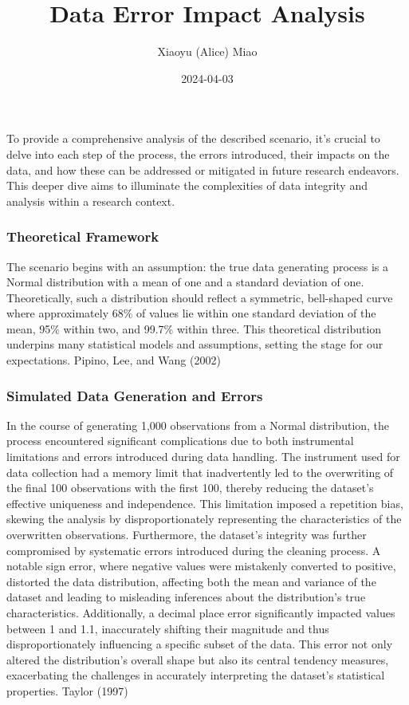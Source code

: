 \documentclass[
  letterpaper,
  DIV=11,
  numbers=noendperiod]{scrartcl}
\title{Data Error Impact Analysis}
\author{Xiaoyu (Alice) Miao}
\date{2024-04-03}
\begin{document}
\maketitle

To provide a comprehensive analysis of the described scenario, it's
crucial to delve into each step of the process, the errors introduced,
their impacts on the data, and how these can be addressed or mitigated
in future research endeavors. This deeper dive aims to illuminate the
complexities of data integrity and analysis within a research context.

\subsubsection{\texorpdfstring{\textbf{Theoretical
Framework}}{Theoretical Framework}}\label{theoretical-framework}

The scenario begins with an assumption: the true data generating process
is a Normal distribution with a mean of one and a standard deviation of
one. Theoretically, such a distribution should reflect a symmetric,
bell-shaped curve where approximately 68\% of values lie within one
standard deviation of the mean, 95\% within two, and 99.7\% within
three. This theoretical distribution underpins many statistical models
and assumptions, setting the stage for our expectations. Pipino, Lee,
and Wang (2002)

\subsubsection{Simulated Data Generation and
Errors}\label{simulated-data-generation-and-errors}

In the course of generating 1,000 observations from a Normal
distribution, the process encountered significant complications due to
both instrumental limitations and errors introduced during data
handling. The instrument used for data collection had a memory limit
that inadvertently led to the overwriting of the final 100 observations
with the first 100, thereby reducing the dataset's effective uniqueness
and independence. This limitation imposed a repetition bias, skewing the
analysis by disproportionately representing the characteristics of the
overwritten observations. Furthermore, the dataset's integrity was
further compromised by systematic errors introduced during the cleaning
process. A notable sign error, where negative values were mistakenly
converted to positive, distorted the data distribution, affecting both
the mean and variance of the dataset and leading to misleading
inferences about the distribution's true characteristics. Additionally,
a decimal place error significantly impacted values between 1 and 1.1,
inaccurately shifting their magnitude and thus disproportionately
influencing a specific subset of the data. This error not only altered
the distribution's overall shape but also its central tendency measures,
exacerbating the challenges in accurately interpreting the dataset's
statistical properties. Taylor (1997)
\end{document}
